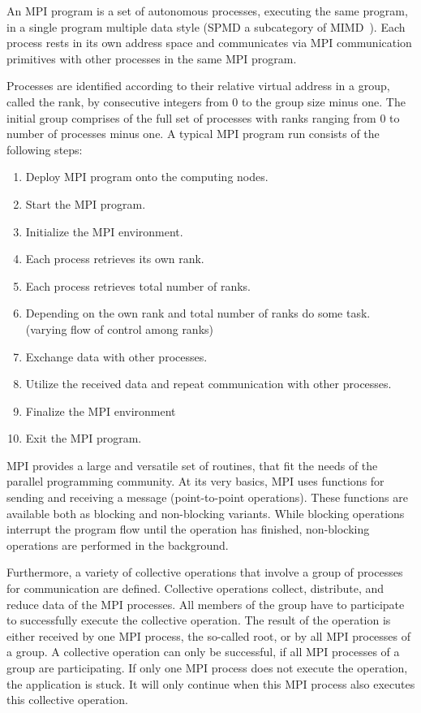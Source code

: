 An MPI program is a set of autonomous processes, executing the same
program, in a single program multiple data style (SPMD a subcategory
of MIMD~\cite{Flynn:1972:COE:1952456.1952459}). Each process rests in
its own address space and communicates via MPI communication
primitives with other processes in the same MPI program.

Processes are identified according to their relative virtual address
in a group, called the rank, by consecutive integers from 0 to the
group size minus one. The initial group comprises of the full set of
processes with ranks ranging from 0 to number of processes minus
one. A typical MPI program run consists of the following steps:

\begin{enumerate}
\item Deploy MPI program onto the computing nodes.
\item Start the MPI program.
\item Initialize the MPI environment.
\item Each process retrieves its own rank.
\item Each process retrieves total number of ranks.
\item Depending on the own rank and total number of ranks do some
  task.\\ (varying flow of control among ranks)
\item Exchange data with other processes.
\item Utilize the received data and repeat communication with other processes.
\item Finalize the MPI environment
\item Exit the MPI program.
\end{enumerate}

MPI provides a large and versatile set of routines, that fit the needs
of the parallel programming community. At its very basics, MPI uses
functions for sending and receiving a message (point-to-point
operations).  These functions are available both as blocking and
non-blocking variants. While blocking operations interrupt the program
flow until the operation has finished, non-blocking operations are
performed in the background.

Furthermore, a variety of collective operations that involve a group
of processes for communication are defined. Collective operations
collect, distribute, and reduce data of the MPI processes.  All members
of the group have to participate to successfully execute the
collective operation.  The result of the operation is either received
by one MPI process, the so-called root, or by all MPI processes of a group.  A
collective operation can only be successful, if all MPI processes of a
group are participating. If only one MPI process does not execute the
operation, the application is stuck. It will only continue when
this MPI process also executes this collective operation.


